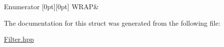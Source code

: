 \begin{DoxyEnumFields}{Enumerator}
[0pt][0pt]{}\mbox{\label{struct_num_cpp_1_1_filter_1_1_boundary_a3fb520b67d524104db12ceef41adf081aaa1813005ea6e5c748220e455b772115}} 
W\+R\+AP&\\
\hline

\end{DoxyEnumFields}


The documentation for this struct was generated from the following file\+:\begin{DoxyCompactItemize}
\item 
\mbox{\hyperlink{_filter_8hpp}{Filter.\+hpp}}\end{DoxyCompactItemize}
